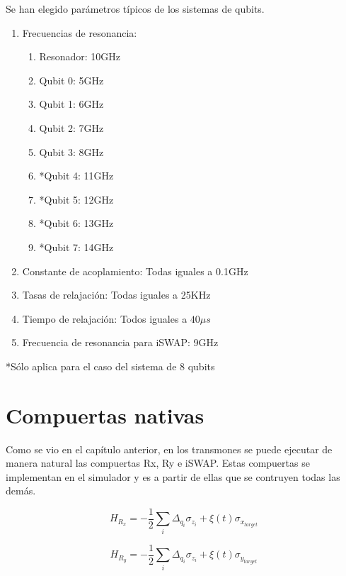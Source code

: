 Se han elegido parámetros típicos de los sistemas de qubits\cite{blais}.

\begin{enumerate}
    \item Frecuencias de resonancia:
        \begin{enumerate}
            \item Resonador: 10GHz
            \item Qubit 0: 5GHz
            \item Qubit 1: 6GHz
            \item Qubit 2: 7GHz
            \item Qubit 3: 8GHz
            \item *Qubit 4: 11GHz
            \item *Qubit 5: 12GHz
            \item *Qubit 6: 13GHz
            \item *Qubit 7: 14GHz
        \end{enumerate}
    \item Constante de acoplamiento: Todas iguales a 0.1GHz
    \item Tasas de relajación: Todas iguales a 25KHz
    \item Tiempo de relajación: Todos iguales a $40 \mu s$
    \item Frecuencia de resonancia para iSWAP: 9GHz
\end{enumerate}

*Sólo aplica para el caso del sistema de 8 qubits

\section{Compuertas nativas}

Como se vio en el capítulo anterior, en los transmones se puede ejecutar de manera natural las compuertas Rx, Ry e iSWAP. Estas compuertas se implementan en el simulador y es a partir de ellas que se contruyen todas las demás.

\begin{equation}
    H_{R_x} = -\frac{1}{2} \sum\limits_i \Delta_{q_i} \sigma_{z_i} + \xi(t) \sigma_{x_{target}}
\end{equation}

\begin{equation}
    H_{R_y} = -\frac{1}{2} \sum\limits_i \Delta_{q_i} \sigma_{z_i} + \xi(t) \sigma_{y_{target}}
\end{equation}

